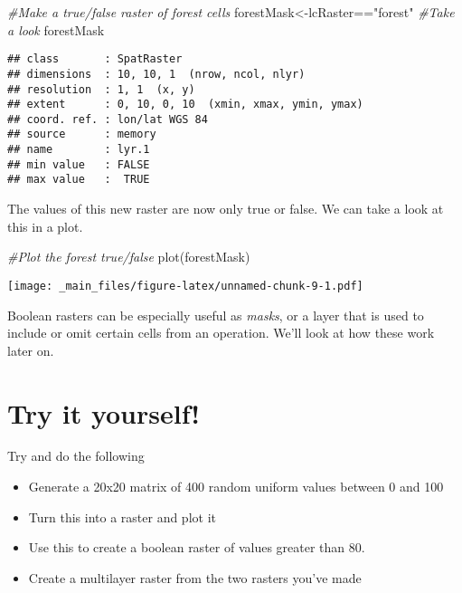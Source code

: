 \documentclass[
]{book}
\newenvironment{Shaded}{\begin{snugshade}}{\end{snugshade}}
\newcommand{\CommentTok}[1]{\textcolor[rgb]{0.56,0.35,0.01}{\textit{#1}}}
\newcommand{\FunctionTok}[1]{\textcolor[rgb]{0.00,0.00,0.00}{#1}}
\newcommand{\NormalTok}[1]{#1}
\newcommand{\OtherTok}[1]{\textcolor[rgb]{0.56,0.35,0.01}{#1}}
\newcommand{\SpecialCharTok}[1]{\textcolor[rgb]{0.00,0.00,0.00}{#1}}
\newcommand{\StringTok}[1]{\textcolor[rgb]{0.31,0.60,0.02}{#1}}
\providecommand{\tightlist}{%
  \setlength{\itemsep}{0pt}\setlength{\parskip}{0pt}}
\begin{document}
\begin{Shaded}
\begin{Highlighting}[]
\CommentTok{\#Make a true/false raster of forest cells}
\NormalTok{forestMask}\OtherTok{\textless{}{-}}\NormalTok{lcRaster}\SpecialCharTok{==}\StringTok{"forest"}
\CommentTok{\#Take a look}
\NormalTok{forestMask}
\end{Highlighting}
\end{Shaded}

\begin{verbatim}
## class       : SpatRaster 
## dimensions  : 10, 10, 1  (nrow, ncol, nlyr)
## resolution  : 1, 1  (x, y)
## extent      : 0, 10, 0, 10  (xmin, xmax, ymin, ymax)
## coord. ref. : lon/lat WGS 84 
## source      : memory 
## name        : lyr.1 
## min value   : FALSE 
## max value   :  TRUE
\end{verbatim}

The values of this new raster are now only true or false. We can take a look at this in a plot.

\begin{Shaded}
\begin{Highlighting}[]
\CommentTok{\#Plot the forest true/false}
\FunctionTok{plot}\NormalTok{(forestMask)}
\end{Highlighting}
\end{Shaded}

\texttt{[image: \_main\_files/figure-latex/unnamed-chunk-9-1.pdf]}

Boolean rasters can be especially useful as \emph{masks}, or a layer that is used to include or omit certain cells from an operation. We'll look at how these work later on.

\hypertarget{try-it-yourself}{%
\section{Try it yourself!}\label{try-it-yourself}}

Try and do the following

\begin{itemize}
\tightlist
\item
  Generate a 20x20 matrix of 400 random uniform values between 0 and 100
\item
  Turn this into a raster and plot it
\item
  Use this to create a boolean raster of values greater than 80.
\item
  Create a multilayer raster from the two rasters you've made
\end{itemize}
\end{document}
